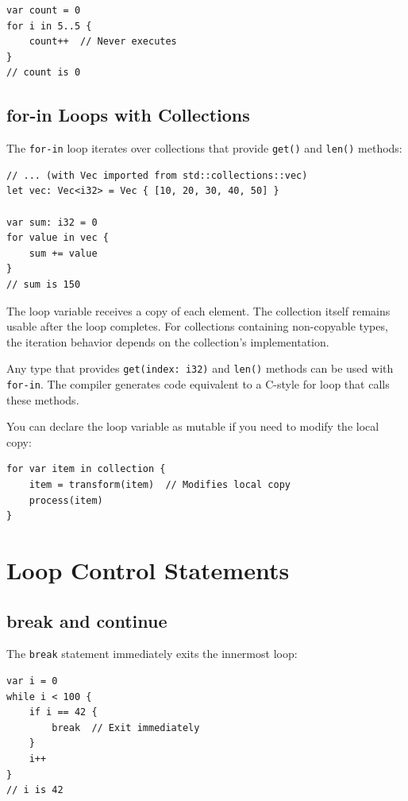 \begin{lstlisting}
var count = 0
for i in 5..5 {
    count++  // Never executes
}
// count is 0
\end{lstlisting}

\subsection{for-in Loops with Collections}
\label{subsec:for-in}

The \texttt{for-in} loop iterates over collections that provide \texttt{get()} and \texttt{len()} methods:

\begin{lstlisting}
// ... (with Vec imported from std::collections::vec)
let vec: Vec<i32> = Vec { [10, 20, 30, 40, 50] }

var sum: i32 = 0
for value in vec {
    sum += value
}
// sum is 150
\end{lstlisting}

The loop variable receives a copy of each element. The collection itself remains usable after the loop completes. For collections containing non-copyable types, the iteration behavior depends on the collection's implementation.

Any type that provides \texttt{get(index: i32)} and \texttt{len()} methods can be used with \texttt{for-in}. The compiler generates code equivalent to a C-style for loop that calls these methods.

You can declare the loop variable as mutable if you need to modify the local copy:

\begin{lstlisting}
for var item in collection {
    item = transform(item)  // Modifies local copy
    process(item)
}
\end{lstlisting}

\section{Loop Control Statements}
\label{sec:loop-control}

\subsection{break and continue}
\label{subsec:break-continue}

The \texttt{break} statement immediately exits the innermost loop:

\begin{lstlisting}
var i = 0
while i < 100 {
    if i == 42 {
        break  // Exit immediately
    }
    i++
}
// i is 42
\end{lstlisting}

